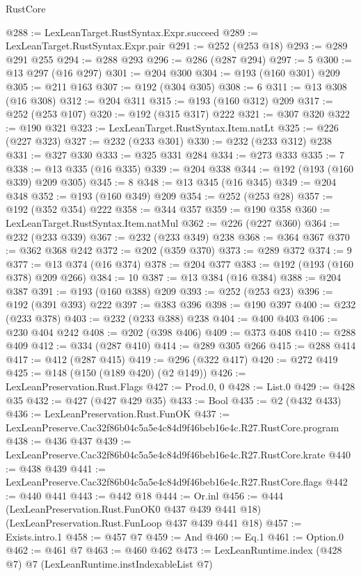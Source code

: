 \begin{lexlean}{RustCore}
\begin{coremodule}
@288 := LexLeanTarget.RustSyntax.Expr.succeed
@289 := LexLeanTarget.RustSyntax.Expr.pair
@291 := @252 (@253 @18)
@293 := @289 @291 @255
@294 := @288 @293
@296 := @286 (@287 @294)
@297 := 5
@300 := @13 @297 (@16 @297)
@301 := @204 @300
@304 := @193 (@160 @301) @209
@305 := @211 @163
@307 := @192 (@304 @305)
@308 := 6
@311 := @13 @308 (@16 @308)
@312 := @204 @311
@315 := @193 (@160 @312) @209
@317 := @252 (@253 @107)
@320 := @192 (@315 @317) @222
@321 := @307 @320
@322 := @190 @321
@323 := LexLeanTarget.RustSyntax.Item.natLt
@325 := @226 (@227 @323)
@327 := @232 (@233 @301)
@330 := @232 (@233 @312) @238
@331 := @327 @330
@333 := @325 @331 @284
@334 := @273 @333
@335 := 7
@338 := @13 @335 (@16 @335)
@339 := @204 @338
@344 := @192 (@193 (@160 @339) @209 @305)
@345 := 8
@348 := @13 @345 (@16 @345)
@349 := @204 @348
@352 := @193 (@160 @349) @209
@354 := @252 (@253 @28)
@357 := @192 (@352 @354) @222
@358 := @344 @357
@359 := @190 @358
@360 := LexLeanTarget.RustSyntax.Item.natMul
@362 := @226 (@227 @360)
@364 := @232 (@233 @339)
@367 := @232 (@233 @349) @238
@368 := @364 @367
@370 := @362 @368 @242
@372 := @202 (@359 @370)
@373 := @289 @372
@374 := 9
@377 := @13 @374 (@16 @374)
@378 := @204 @377
@383 := @192 (@193 (@160 @378) @209 @266)
@384 := 10
@387 := @13 @384 (@16 @384)
@388 := @204 @387
@391 := @193 (@160 @388) @209
@393 := @252 (@253 @23)
@396 := @192 (@391 @393) @222
@397 := @383 @396
@398 := @190 @397
@400 := @232 (@233 @378)
@403 := @232 (@233 @388) @238
@404 := @400 @403
@406 := @230 @404 @242
@408 := @202 (@398 @406)
@409 := @373 @408
@410 := @288 @409
@412 := @334 (@287 @410)
@414 := @289 @305 @266
@415 := @288 @414
@417 := @412 (@287 @415)
@419 := @296 (@322 @417)
@420 := @272 @419
@425 := @148 (@150 (@189 @420) (@2 @149))
@426 := LexLeanPreservation.Rust.Flags
@427 := Prod.{0, 0}
@428 := List.{0}
@429 := @428 @35
@432 := @427 (@427 @429 @35)
@433 := Bool
@435 := @2 (@432 @433)
@436 := LexLeanPreservation.Rust.FunOK
@437 := LexLeanPreserve.Cac32f86b04c5a5e4c84d9f46beb16e4c.R27.RustCore.program
@438 := @436 @437
@439 := LexLeanPreserve.Cac32f86b04c5a5e4c84d9f46beb16e4c.R27.RustCore.krate
@440 := @438 @439
@441 := LexLeanPreserve.Cac32f86b04c5a5e4c84d9f46beb16e4c.R27.RustCore.flags
@442 := @440 @441
@443 := @442 @18
@444 := Or.inl
@456 := @444
    (LexLeanPreservation.Rust.FunOK0 @437 @439 @441 @18)
    (LexLeanPreservation.Rust.FunLoop @437 @439 @441 @18)
@457 := Exists.intro.{1}
@458 := @457 @7
@459 := And
@460 := Eq.{1}
@461 := Option.{0}
@462 := @461 @7
@463 := @460 @462
@473 := LexLeanRuntime.index
    (@428 @7)
    @7
    (LexLeanRuntime.instIndexableList @7)

\end{coremodule}
\end{lexlean}
